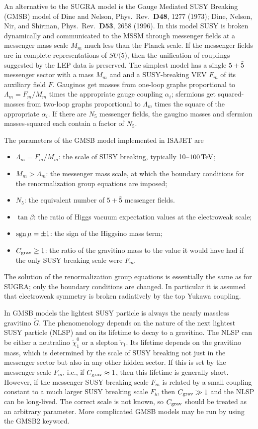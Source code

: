       An alternative to the SUGRA model is the Gauge Mediated SUSY
Breaking (GMSB) model of Dine and Nelson, Phys.\ Rev.\ {\bf D48}, 1277
(1973); Dine, Nelson, Nir, and Shirman, Phys.\ Rev.\ {\bf D53}, 2658
(1996). In this model SUSY is broken dynamically and communicated to the
MSSM through messenger fields at a messenger mass scale $M_m$ much less
than the Planck scale. If the messenger fields are in complete
representations of $SU(5$), then the unification of couplings suggested
by the LEP data is preserved. The simplest model has a single $5+\bar5$
messenger sector with a mass $M_m$ and and a SUSY-breaking VEV $F_m$ of
its auxiliary field $F$. Gauginos get masses from one-loop graphs
proportional to $\Lambda_m = F_m / M_m$ times the appropriate gauge
coupling $\alpha_i$; sfermions get squared-masses from two-loop graphs
proportional to $\Lambda_m$ times the square of the appropriate
$\alpha_i$. If there are $N_5$ messenger fields, the gaugino masses and
sfermion masses-squared each contain a factor of $N_5$.

      The parameters of the GMSB model implemented in ISAJET are
\begin{itemize}
\item $\Lambda_m = F_m/M_m$: the scale of SUSY breaking, typically
10--$100\,{\rm TeV}$;
\item $M_m > \Lambda_m$: the messenger mass scale, at which the boundary
conditions for the renormalization group equations are imposed;
\item $N_5$: the equivalent number of $5+\bar5$ messenger fields.
\item $\tan\beta$: the ratio of Higgs vacuum expectation values at the
electroweak scale;
\item $\mathop{\rm sgn}\mu=\pm1$: the sign of the Higgsino mass term;
\item $C_{\rm grav}\ge1$: the ratio of the gravitino mass to the value it
would have had if the only SUSY breaking scale were $F_m$.
\end{itemize}
The solution of the renormalization group equations is essentially the
same as for SUGRA; only the boundary conditions are changed. In
particular it is assumed that electroweak symmetry is broken radiatively
by the top Yukawa coupling.

      In GMSB models the lightest SUSY particle is always the nearly
massless gravitino $\tilde G$. The phenomenology depends on the nature
of the next lightest SUSY particle (NLSP) and on its lifetime to decay
to a gravitino. The NLSP can be either a neutralino $\tilde\chi_1^0$ or
a slepton $\tilde\tau_1$. Its lifetime depends on the gravitino mass,
which is determined by the scale of SUSY breaking not just in the
messenger sector but also in any other hidden sector. If this is set by
the messenger scale $F_m$, i.e., if $C_{\rm grav}\approx1$, then this
lifetime is generally short. However, if the messenger SUSY breaking
scale $F_m$ is related by a small coupling constant to a much larger
SUSY breaking scale $F_b$, then $C_{\rm grav}\gg1$ and the NLSP can be
long-lived. The correct scale is not known, so $C_{\rm grav}$ should be
treated as an arbitrary parameter. More complicated GMSB models may be
run by using the GMSB2 keyword.

